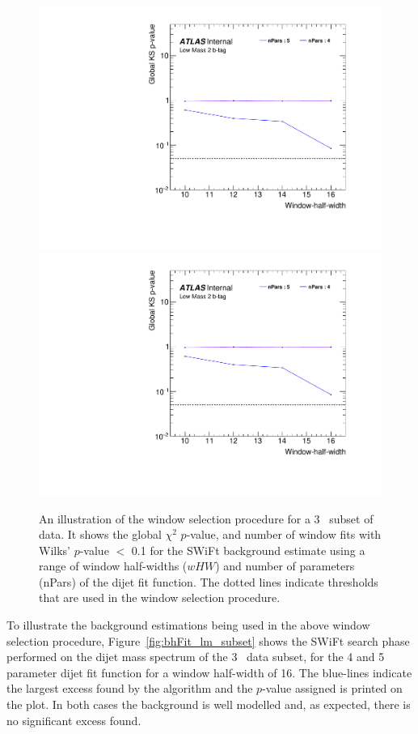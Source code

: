\begin{figure}[!htb]
\captionsetup[subfigure]{aboveskip=0pt,justification=centering}
\centering
{} {
  \includegraphics[width=0.45\linewidth, angle=0,page=2]{figs/Dibjet/LowMass/FitStudy_min566/windowSel_subset.pdf}
}\hspace{-8mm}
 {
  \includegraphics[width=0.45\linewidth, angle=0,page=4]{figs/Dibjet/LowMass/FitStudy_min566/windowSel_subset.pdf}
}

\caption{\label{fig:windowSel_subset}
  An illustration of the window selection procedure for a 3~\ifb{} subset of \lm{} data.
  It shows the global $\chi^{2}$ \mbox{$p$-value}, %
  and number of window fits with Wilks' \mbox{$p$-value} $<$ 0.1 for the SWiFt background estimate
  using a range of window half-widths ($wHW$) and number of parameters (nPars) of the dijet fit function.
  The dotted lines indicate thresholds that are used in the window selection procedure.
}
\end{figure}

To illustrate the background estimations being used in the above window selection procedure,
Figure~\ref{fig:bhFit_lm_subset} shows the SWiFt search phase performed on the dijet mass spectrum of the 3~\ifb{} data subset,
for the 4 and 5 parameter dijet fit function for a window half-width of 16.
The blue-lines indicate the largest excess found by the \bh{} algorithm and the \mbox{$p$-value} assigned is printed on the plot. 
In both cases the background is well modelled and, as expected, there is no significant excess found.

